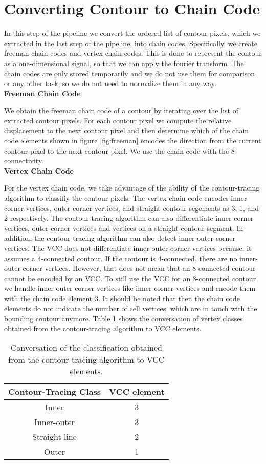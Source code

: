 \documentclass[thesis.tex]{subfiles}
\begin{document}
\section{Converting Contour to Chain Code}
\label{section:chaincode}
In this step of the pipeline we convert the ordered list of contour pixels, which we extracted in the last step of the pipeline, into chain codes.  Specifically, we create freeman chain codes and vertex chain codes. This is done to represent the contour as a one-dimensional signal, so that we can apply the fourier transform. The chain codes are only stored temporarily and we do not use them for comparison or any other task, so we do not need to normalize them in any way. \\

\textbf{Freeman Chain Code}

We obtain the freeman chain code of a contour by iterating over the list of extracted contour pixels. For each contour pixel we compute the relative displacement to the next contour pixel and then determine which of the chain code elements shown in figure \ref{fig:freeman} encodes the direction from the current contour pixel to the next contour pixel. We use the chain code with the 8-connectivity. \\

\textbf{Vertex Chain Code}

For the vertex chain code, we take advantage of the ability of the contour-tracing algorithm to classifiy the contour pixels. The vertex chain code encodes inner corner vertices, outer corner vertices, and straight contour segements as 3, 1, and 2 respectively. The contour-tracing algorithm can also differentiate inner corner vertices, outer corner vertices and vertices on a straight contour segment. In addition, the contour-tracing algorithm can also detect inner-outer corner vertices. The VCC does not differentiate inner-outer corner vertices because, it assumes a 4-connected contour. If the contour is 4-connected, there are no inner-outer corner vertices. However, that does not mean that an 8-connected contour cannot be encoded by an VCC. To still use the VCC for an 8-connected contour we handle inner-outer corner vertices like inner corner vertices and encode them with the chain code element 3. It should be noted that then the chain code elements do not indicate the number of cell vertices, which are in touch with the bounding contour anymore. Table \ref{vcc_table}  shows the conversation of vertex classes obtained from the contour-tracing algorithm to VCC elements. 
\begin{table}[h!]
\centering
 \begin{tabular}{||c c||} 
 \hline
 Contour-Tracing Class &  VCC element\\ [0.5ex] 
 \hline\hline
 Inner & 3 \\ 
 \hline
 Inner-outer & 3 \\
 \hline
 Straight line & 2 \\
 \hline
 Outer & 1 \\
 \hline
 \hline
\end{tabular}
\caption{Conversation of the classification obtained from the contour-tracing algorithm to VCC elements.}
\label{vcc_table}
\end{table}
 
\end{document}
